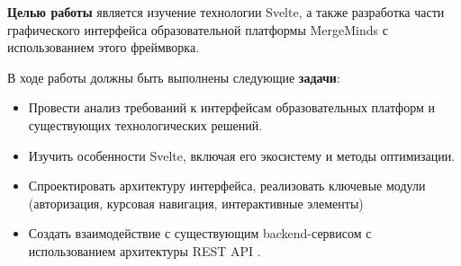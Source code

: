\documentclass[bachelor, och, coursework]{SCWorks}
\begin{document}
\textbf{Целью работы} является изучение технологии Svelte, а также разработка части графического интерфейса образовательной платформы MergeMinds с использованием этого фреймворка.

В ходе работы должны быть выполнены следующие \textbf{задачи}:
\begin{itemize}
  \item Провести анализ требований к интерфейсам образовательных платформ и существующих технологических решений.
  \item Изучить особенности Svelte, включая его экосистему и методы оптимизации.
  \item Спроектировать архитектуру интерфейса, реализовать ключевые модули (авторизация, курсовая навигация, интерактивные элементы)
  \item Создать взаимодействие с существующим backend-сервисом с использованием архитектуры REST API \cite{intro_rest_api}.
\end{itemize}


\conclusion






\appendix
\end{document}
